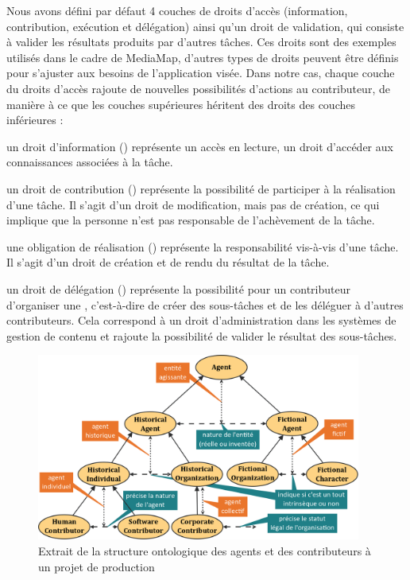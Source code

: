 Nous avons défini par défaut 4 couches de droits d'accès (information, contribution, exécution et délégation) ainsi qu'un droit de validation, qui consiste à valider les résultats produits par d'autres tâches.  
Ces droits sont des exemples utilisés dans le cadre de MediaMap, d'autres types de droits peuvent être définis pour s'ajuster aux besoins de l'application visée.
Dans notre cas, chaque couche du droits d'accès rajoute de nouvelles possibilités d'actions au contributeur, de manière à ce que les couches supérieures héritent des droits des couches inférieures : 
\begin{liste}
	\item un droit d'information () représente un accès en lecture, un droit d'accéder aux connaissances associées à la tâche.

	\item un droit de contribution () représente la possibilité de participer à la réalisation d'une tâche. 
	Il s'agit d'un droit de modification, mais pas de création, ce qui implique que la personne n'est pas responsable de l'achèvement de la tâche.

	\item une obligation de réalisation () représente la responsabilité vis-à-vis d'une tâche. 
	Il s'agit d'un droit de création et de rendu du résultat de la tâche.

	\item un droit de délégation () représente la possibilité pour un contributeur d'organiser une , c'est-à-dire de créer des sous-tâches et de les déléguer à d'autres contributeurs.
	Cela correspond à un droit d'administration dans les systèmes de gestion de contenu et rajoute la possibilité de valider le résultat des sous-tâches.
\end{liste}


\begin{figure}[ht!]
\centering
\includegraphics[width=0.95\textwidth]{./images/SO-Agent-v1.png}
\caption{Extrait de la structure ontologique des agents et des contributeurs à un projet de production}
\label{img:so-agent}
\end{figure}

